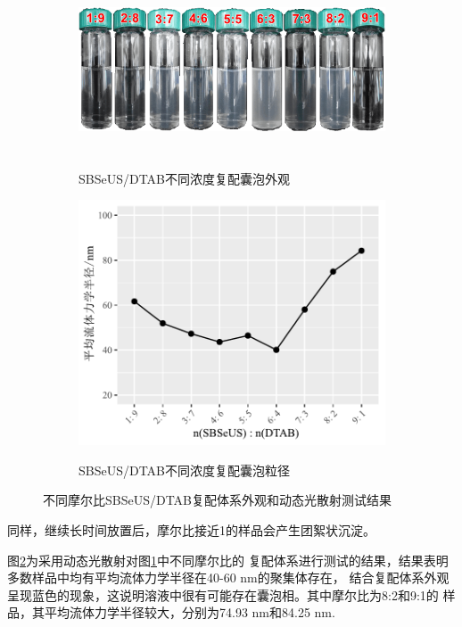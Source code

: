 \documentclass[bachelor,fandolfonts,replaceperiod]{jnuthesis}
\begin{document}
    \begin{figure}[htbp]
        \centering
        \begin{subfigure}[]{\textwidth}
            \centering
            \includegraphics[height=5cm]{figure/SBSeUS-DTAB-ratio.png}\\
            \caption{SBSeUS/DTAB不同浓度复配囊泡外观}\label{fig:SBSeUS-DTAB-ratio}
        \end{subfigure}%

        \begin{subfigure}[]{\textwidth}
            \centering
            \includegraphics[width=.6\textwidth]{figure/SBSeUS-DTAB-ratio-fig.pdf}\\
            \caption{SBSeUS/DTAB不同浓度复配囊泡粒径}\label{fig:SBSeUS-DTAB-ratio-fig}
        \end{subfigure}%
        \caption{不同摩尔比SBSeUS/DTAB复配体系外观和动态光散射测试结果}
        \label{fig:不同摩尔比SBSeUS/DTAB}
    \end{figure}
    同样，继续长时间放置后，摩尔比接近1的样品会产生团絮状沉淀。
    
    图\ref{fig:SBSeUS-DTAB-ratio-fig}为采用动态光散射对图\ref{fig:SBSeUS-DTAB-ratio}中不同摩尔比的
    复配体系进行测试的结果，结果表明多数样品中均有平均流体力学半径在40-60 nm的聚集体存在，
    结合复配体系外观呈现蓝色的现象，这说明溶液中很有可能存在囊泡相。其中摩尔比为8:2和9:1的
    样品，其平均流体力学半径较大，分别为74.93 nm和84.25 nm.
    
\end{document}

